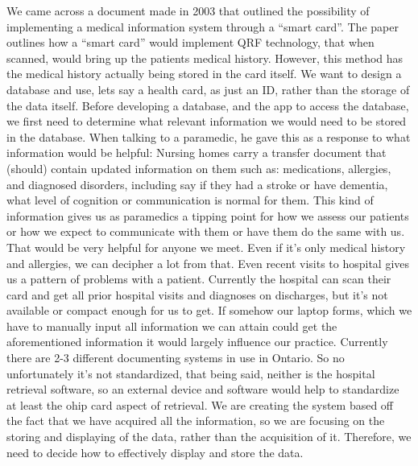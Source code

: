 \fi


We came across a document made in 2003 that outlined the possibility of implementing a medical information system through a “smart card”. The paper outlines how a “smart card” would implement QRF technology, that when scanned, would bring up the patients medical history. However, this method has the medical history actually being stored in the card itself. We want to design a database and use, lets say a health card, as just an ID, rather than the storage of the data itself.
Before developing a database, and the app to access the database, we first need to determine what relevant information we would need to be stored in the database. When talking to a paramedic, he gave this as a response to what information would be helpful:
Nursing homes carry a transfer document that (should) contain updated information on them such as: medications, allergies, and diagnosed disorders, including say if they had a stroke or have dementia, what level of cognition or communication is normal for them. This kind of information gives us as paramedics a tipping point for how we assess our patients or how we expect to communicate with them or have them do the same with us. That would be very helpful for anyone we meet. Even if it's only medical history and allergies, we can decipher a lot from that. Even recent visits to hospital gives us a pattern of problems with a patient. Currently the hospital can scan their card and get all prior hospital visits and diagnoses on discharges, but it's not available or compact enough for us to get. If somehow our laptop forms, which we have to manually input all information we can attain could get the aforementioned information it would largely influence our practice. Currently there are 2-3 different documenting systems in use in Ontario. So no unfortunately it's not standardized, that being said, neither is the hospital retrieval software, so an external device and software would help to standardize at least the ohip card aspect of retrieval.
We are creating the system based off the fact that we have acquired all the information, so we are focusing on the storing and displaying of the data, rather than the acquisition of it. Therefore, we need to decide how to effectively display and store the data.
